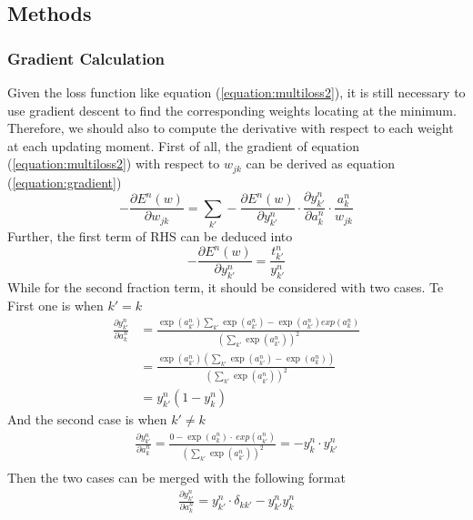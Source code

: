 \documentclass{article}
\begin{document}
\subsection{Methods}
\subsubsection{Gradient Calculation}
Given the loss function like equation (\ref{equation:multiloss2}), it is still necessary to use gradient descent to find the corresponding weights locating at the minimum. Therefore, we should also to compute the derivative with respect to each weight at each updating moment. First of all, the gradient of equation (\ref{equation:multiloss2}) with respect to $w_{jk}$ can be derived as equation (\ref{equation:gradient})
\begin{equation}
-\frac{\partial E^n(w)}{\partial w_{jk}}= \sum_{k'} -\frac{\partial E^n(w)}{\partial y_{k'}^n}\cdot \frac{\partial y_{k'}^n}{\partial a_k^n}\cdot \frac{a_k^n}{w_{jk}}
\label{equation:gradient}
\end{equation}
Further, the first term of RHS can be deduced into
$$-\frac{\partial E^n(w)}{\partial y_{k'}^n}= \frac{t_{k'}^n}{y_{k'}^n}$$
While for the second fraction term, it should be considered with two cases. Te First one is when $k'=k$
\begin{equation}
\begin{split}
     \frac{\partial y_{k'}^n}{\partial a_k^n}
     &=\frac{\exp(a_{k'}^n) \sum_{k'} \exp(a_{k'}^n)-\exp(a_{k'}^n)exp(a_k^n)}{(\sum_{k'}\exp(a_{k'}^n))^2}\\
     &= \frac{\exp(a_{k'}^n)(\sum_{k'}\exp(a_{k'}^n)-\exp(a_k^n))}{(\sum_{k'}\exp(a_{k'}^n))^2}\\
     &= y_{k'}^n(1-y_k^n)
\end{split}
\end{equation}
And the second case is when $k'\neq k$
\begin{equation}
    \begin{split}
    \frac{\partial y_{k'}^n}{\partial a_k^n}=\frac{0-\exp(a_k^n)\cdot \ exp(a_{k'}^n)}{(\sum_{k'}\exp(a_{k'}^n))^2}= -y_k^n\cdot y_{k'}^n \\
    \end{split}
\end{equation}
Then the two cases can be merged with the following format
\begin{align*}
\frac{\partial y_{k'}^n}{\partial a_k^n} = y_{k'}^n\cdot \delta_{kk'}-y_{k'}^ny_k^n\\
\end{align*}
\end{document}
